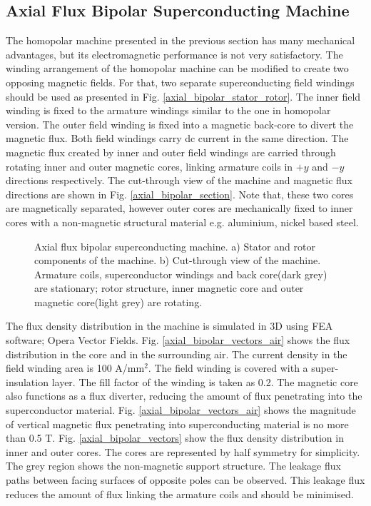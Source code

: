 \documentclass[final,peerreview,onecolumn]{IEEEtran}
\begin{document}
\subsection{Axial Flux Bipolar Superconducting Machine}


The homopolar machine presented in the previous section has many mechanical advantages, but its electromagnetic performance is not very satisfactory. The winding arrangement of the homopolar machine can be modified to create two opposing magnetic fields.  For that, two separate superconducting field windings should be used as presented in Fig. \ref{axial_bipolar_stator_rotor}. The inner field winding is fixed to the armature windings similar to the one in homopolar version. The outer field winding is fixed into a magnetic back-core to divert the magnetic flux. Both field windings carry dc current in the same direction. The  magnetic flux created by inner and outer field windings are carried through rotating inner and outer magnetic cores, linking armature coils in $+y$ and $-y$ directions respectively. The cut-through view of the machine and magnetic flux directions are shown in Fig. \ref{axial_bipolar_section}. Note that, these two cores are magnetically separated, however outer cores are mechanically fixed to inner cores with a non-magnetic structural material e.g. aluminium, nickel based steel.

\begin{figure}[!h]
\centerline{
\hfil
{}
}
\caption{Axial flux bipolar superconducting machine. a) Stator and rotor components of the machine. 
b) Cut-through view of the machine. Armature coils, superconductor windings and back core(dark grey) are stationary; rotor structure, inner magnetic core and outer magnetic core(light grey) are rotating. }
\end{figure}

The flux density distribution in the machine is simulated in 3D using FEA software; Opera Vector Fields. Fig. \ref{axial_bipolar_vectors_air} shows the flux distribution in the core and in the surrounding air. The current density in the field winding area is 100 A/mm$^{2}$. The field winding is covered with a super-insulation layer. The fill factor of the winding is taken as 0.2. The magnetic core also functions as a flux diverter, reducing the amount of flux penetrating into the superconductor material. Fig. \ref{axial_bipolar_vectors_air} shows the magnitude of vertical magnetic flux penetrating into superconducting material is no more than 0.5 T.  Fig. \ref{axial_bipolar_vectors} show the flux density distribution in inner and outer cores. The cores are represented by half symmetry for simplicity. The grey region shows the non-magnetic support structure. The leakage flux paths between facing surfaces of opposite poles can be observed. This leakage flux reduces the amount of flux linking the armature coils and should be minimised.
\end{document}
